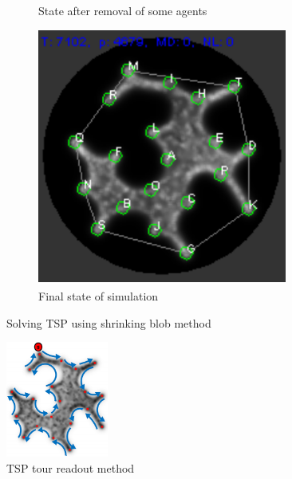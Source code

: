 \documentclass[english,a4paper,twoside]{ppfcmthesis}
\begin{document}
\begin{figure}
\begin{subfigure}{0.3\textwidth}
    \caption{State after removal of some agents}
    \label{figure:bp_tsp_intermediate}
  \end{subfigure}
  \begin{subfigure}{0.3\textwidth}
    \centering
    \includegraphics[width=0.9\textwidth]{background/physarum/tsp_final.png}
    \caption{Final state of simulation}
    \label{figure:bp_tsp_final}
  \end{subfigure}
  \caption{Solving TSP using shrinking blob method \cite{jones2014computation}}
\end{figure}

\begin{figure}
  \centering
  \includegraphics[width=0.3\textwidth]{background/physarum/tsp_readout.png}
  \caption{TSP tour readout method \cite{jones2014computation}}
  \label{figure:bp_tsp_readout}
\end{figure}
\end{document}
